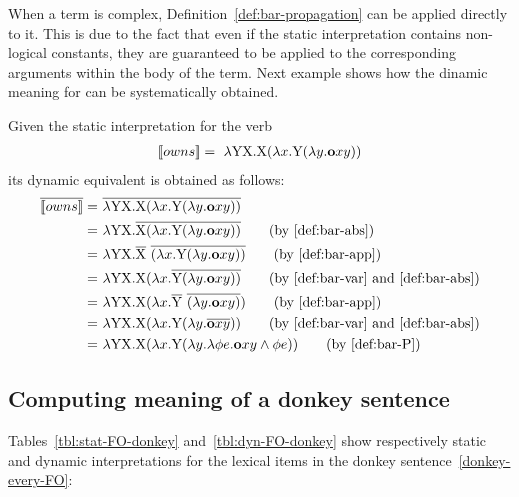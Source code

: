 When a term is complex, Definition~\ref{def:bar-propagation} can be applied directly to it. This is due to the fact that even if the static interpretation contains non-logical constants, they are guaranteed to be applied to the corresponding arguments within the body of the term. Next example shows how the dinamic meaning for  can be systematically obtained.
\begin{example} 
Given the static interpretation for the verb 
\begin{align}
\I{owns} = \  \lambda \Y1 \X1. \X1 ( \lambda \x1. \Y1 (\lambda \y1.  \textbf{o}  \x1 \y1 )) \notag %
\end{align}
its dynamic equivalent is obtained as follows:
\begin{align}
\tr{\I{owns}} = \ & \tr{\lambda \Y1 \X1. \X1 ( \lambda \x1. \Y1 (\lambda \y1.  \textbf{o}  \x1 \y1 ))}  \notag \\
= \ &  \lambda \Y1 \X1. \tr{ \X1 ( \lambda \x1. \Y1 (\lambda \y1.  \textbf{o}  \x1 \y1 ))} \tag{by~\eqref{def:bar-abs}} \\
= \ &  \lambda \Y1 \X1. \tr{ \X1 } \ \tr{ ( \lambda \x1. \Y1 (\lambda \y1.  \textbf{o}  \x1 \y1 ))}  \tag{by~\eqref{def:bar-app}} \\
= \ &  \lambda \Y1 \X1.  \X1   ( \lambda \x1. \tr{ \Y1  (\lambda \y1.  \textbf{o}  \x1 \y1 ))}  \tag{by~\eqref{def:bar-var} and~\eqref{def:bar-abs}} \\
= \ &  \lambda \Y1 \X1.  \X1   ( \lambda \x1. \tr{ \Y1 } \ \tr{ (\lambda \y1.  \textbf{o}  \x1 \y1 )})  \tag{by~\eqref{def:bar-app}} \\
= \ &  \lambda \Y1 \X1.  \X1   ( \lambda \x1.  \Y1   (\lambda \y1. \tr{ \textbf{o}  \x1 \y1 }))  \tag{by~\eqref{def:bar-var} and~\eqref{def:bar-abs}}\\
= \ &  \lambda \Y1 \X1.  \X1   ( \lambda \x1.  \Y1   (\lambda \y1. \lambda \phi e. \textbf{o}  \x1 \y1 \land \phi e)) \tag{by~\eqref{def:bar-P}} 
\end{align}

\end{example}



\subsection{Computing meaning of a donkey sentence}

Tables~\ref{tbl:stat-FO-donkey} and~\ref{tbl:dyn-FO-donkey} show respectively static and dynamic interpretations for the lexical items in the donkey sentence~\eqref{donkey-every-FO}:

